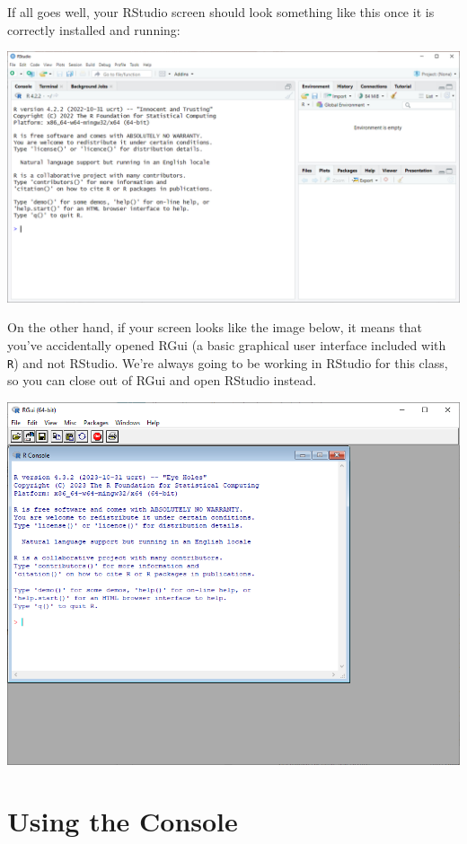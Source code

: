 \documentclass[
]{book}
\begin{document}
If all goes well, your RStudio screen should look something like this once it is correctly installed and running:

\includegraphics{docs/_main_files/figure-html/RStudio clean install.png}

On the other hand, if your screen looks like the image below, it means that you've accidentally opened RGui (a basic graphical user interface included with \texttt{R}) and not RStudio. We're always going to be working in RStudio for this class, so you can close out of RGui and open RStudio instead.

\includegraphics{docs/_main_files/figure-html/Base R GUI.PNG}

\hypertarget{using-the-console}{%
\section{Using the Console}\label{using-the-console}}
\end{document}
